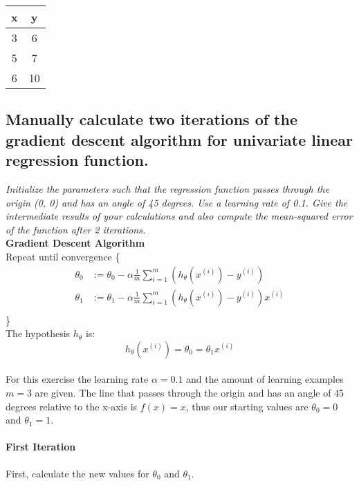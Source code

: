\documentclass[12pt, a4paper]{article}
\begin{document}
\begin{table}[h!]
\centering
\begin{tabular}{c|c}
   x & y \\
   \hline
   3 & 6\\
   5 & 7\\
   6 & 10
\end{tabular}
\end{table}	

	\subsection{Manually  calculate two iterations of the gradient descent algorithm
	for univariate linear regression function. }
	
	\textit{Initialize the parameters such that the regression function
	passes through the origin (0, 0) and has an angle of 45 degrees. Use a learning rate of 0.1. Give the
	intermediate results of your calculations and also compute the mean-squared error of the function
	after 2 iterations.}\\
	
	\textbf{Gradient Descent Algorithm}\\
	
	Repeat until convergence \{
	\begin{align*}
	\theta _0 &:= \theta _0 - \alpha \frac{1}{m} \sum\limits_{i=1}^m (h _{\theta} (x ^{(i)}) - y ^{(i)})\\
	\theta _1 &:= \theta _1 - \alpha \frac{1}{m} \sum\limits_{i=1}^m (h _{\theta} (x ^{(i)}) - y ^{(i)})x^{(i)} \\
	\end{align*}
	\}\\
	
	The hypothesis $h_\theta$ is:
	\begin{equation*}
	h_\theta (x^{(i)}) = \theta_0 = \theta_1 x^{(i)}
	\end{equation*}\\
	
	For this exercise the learning rate $\alpha=0.1$ and the amount of learning examples $m=3$ are given. The line that passes through the origin and has an angle of 45 degrees relative to 		the x-axis is $f(x) = x$, thus our starting values are $\theta_0 = 0$ and $\theta_1 = 1$.
	
	\paragraph{First Iteration}
	First, calculate the new values for $\theta_0$ and $\theta_1$.
	
\end{document}
